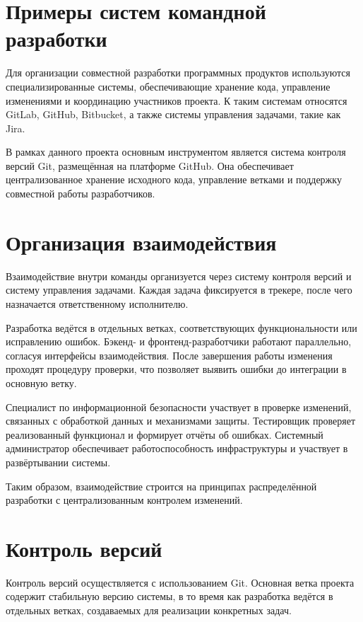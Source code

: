 \documentclass[14pt,a4paper]{extarticle}
\begin{document}
\section{Примеры систем командной разработки}

Для организации совместной разработки программных продуктов используются специализированные системы, обеспечивающие хранение кода, управление изменениями и координацию участников проекта. К таким системам относятся GitLab, GitHub, Bitbucket, а также системы управления задачами, такие как Jira.

В рамках данного проекта основным инструментом является система контроля версий Git, размещённая на платформе GitHub. Она обеспечивает централизованное хранение исходного кода, управление ветками и поддержку совместной работы разработчиков.

\section{Организация взаимодействия}

Взаимодействие внутри команды организуется через систему контроля версий и систему управления задачами. Каждая задача фиксируется в трекере, после чего назначается ответственному исполнителю.

Разработка ведётся в отдельных ветках, соответствующих функциональности или исправлению ошибок. Бэкенд- и фронтенд-разработчики работают параллельно, согласуя интерфейсы взаимодействия. После завершения работы изменения проходят процедуру проверки, что позволяет выявить ошибки до интеграции в основную ветку.

Специалист по информационной безопасности участвует в проверке изменений, связанных с обработкой данных и механизмами защиты. Тестировщик проверяет реализованный функционал и формирует отчёты об ошибках. Системный администратор обеспечивает работоспособность инфраструктуры и участвует в развёртывании системы.

Таким образом, взаимодействие строится на принципах распределённой разработки с централизованным контролем изменений.

\section{Контроль версий}

Контроль версий осуществляется с использованием Git. Основная ветка проекта содержит стабильную версию системы, в то время как разработка ведётся в отдельных ветках, создаваемых для реализации конкретных задач.
\end{document}
